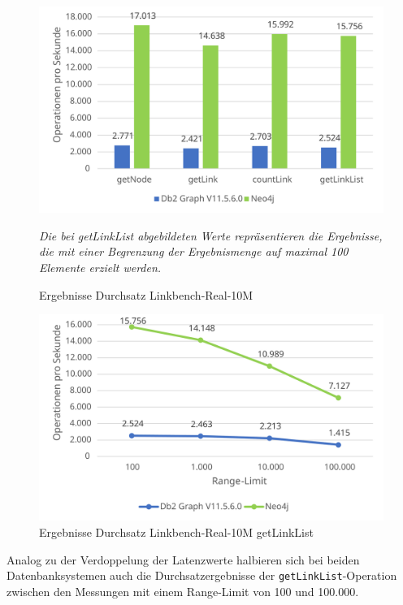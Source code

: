 \begin{figure}[!ht]
    \centering
    \includegraphics[width=\textwidth]{images/diagramme/linkbench_10m_real_durchsatz.pdf}
    \caption{Ergebnisse Durchsatz Linkbench-Real-10M}
    \label{fig:durchsatz:linkbench_10m_real}
    \vspace{1em}
    \textit{Die bei getLinkList abgebildeten Werte repräsentieren die Ergebnisse, die mit einer Begrenzung der Ergebnismenge auf maximal 100 Elemente erzielt werden.}
\end{figure}

\begin{figure}[!ht]
    \centering
    \includegraphics[width=\textwidth]{images/diagramme/limit_absolute_durchsatz_real_10m.pdf}
    \caption{Ergebnisse Durchsatz Linkbench-Real-10M getLinkList}
    \label{fig:durchsatz:linkbench_10m_real:rl}
\end{figure}

Analog zu der Verdoppelung der Latenzwerte halbieren sich bei beiden
Datenbanksystemen auch die Durchsatzergebnisse der \texttt{getLinkList}-Ope\-ra\-ti\-on zwischen den Messungen mit einem Range-Limit von 100 und 100.000.


